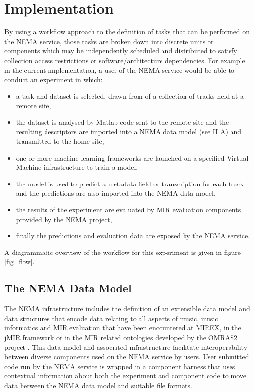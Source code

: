 \documentclass[conference]{IEEEtran}
\begin{document}
\section{Implementation}
By using a workflow approach to the definition of tasks that can be performed on the NEMA service, those tasks are broken down into discrete units or components which may be independently scheduled and distributed to satisfy collection access restrictions or software/architecture dependencies. For example in the current implementation, a user of the NEMA service would be able to conduct an experiment in which:
\begin{itemize}
\item a task and dataset is selected, drawn from of a collection of tracks held at a remote site,
\item the dataset is analysed by Matlab code sent to the remote site and the resulting descriptors are imported into a NEMA data model (see II A) and transmitted to the home site, 
\item one or more machine learning frameworks are launched on a specified Virtual Machine infrastructure to train a model,
\item the model is used to predict a metadata field or transcription for each track and the predictions are also imported into the NEMA data model,
\item the results of the experiment are evaluated by MIR evaluation components provided by the NEMA project,
\item finally the predictions and evaluation data are exposed by the NEMA service.
\end{itemize}
A diagrammatic overview of the workflow for this experiment is given in figure \ref{fig_flow}.



\subsection{The NEMA Data Model}
The NEMA infrastructure includes the definition of an extensible data model and data structures that encode data relating to all aspects of music, music informatics and MIR evaluation that have been encountered at MIREX, in the jMIR framework \cite{mckay2009jmir} or in the MIR related ontologies developed by the OMRAS2 project \cite{raimond2007music}. This data model and associated infrastructure facilitate interoperability between diverse components used on the NEMA service by users.  User submitted code run by the NEMA service is wrapped in a component harness that uses contextual information about both the experiment and component code to move data between the NEMA data model and suitable file formats. %
\end{document}
